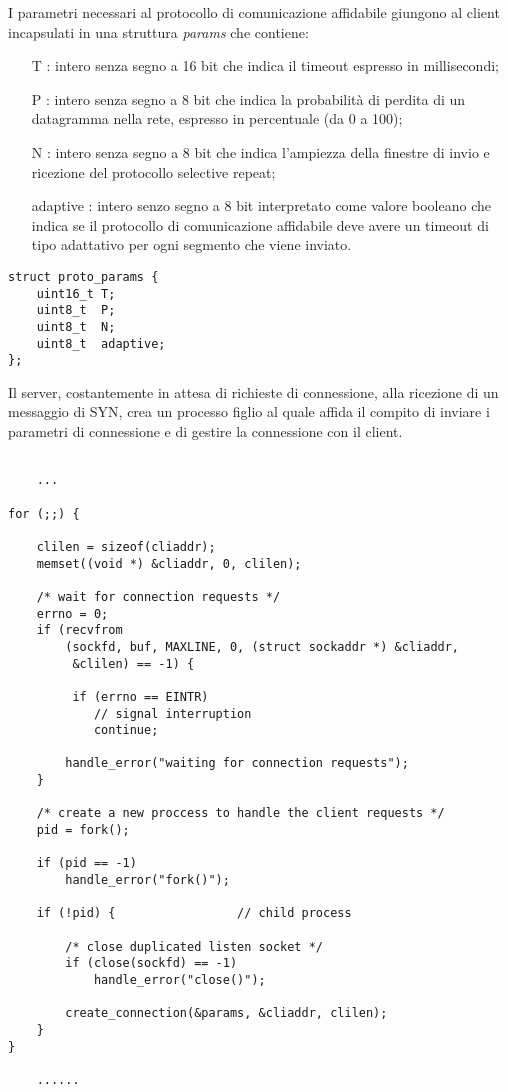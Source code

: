 I parametri necessari al protocollo di comunicazione affidabile  giungono
al client incapsulati in una struttura \emph{params} che contiene:
\begin{itemize}
\item[T]: intero senza segno a 16 bit che indica il timeout espresso in 
millisecondi;
\item[P]: intero senza segno a 8 bit che indica la probabilità di perdita di un
datagramma nella rete, espresso in percentuale (da 0 a 100);
\item[N]: intero senza segno a 8 bit che indica l'ampiezza della finestre di
invio e ricezione del protocollo selective repeat;
\item[adaptive]: intero senzo segno a 8 bit interpretato come valore booleano
che indica se il protocollo di comunicazione affidabile deve avere un timeout
di tipo adattativo per ogni segmento che viene inviato.
\end{itemize}

\begin{lstlisting}[title=basics.h]
struct proto_params {
	uint16_t T;
	uint8_t  P;
	uint8_t  N;
	uint8_t  adaptive;
};
\end{lstlisting}

Il server, costantemente in attesa di richieste di connessione, alla ricezione
di un messaggio di SYN, crea un processo figlio al quale affida il compito di 
inviare i parametri di connessione e di gestire la connessione con il client.

\begin{lstlisting}[title=server: instaurazione della connessione]

	...

for (;;) {

	clilen = sizeof(cliaddr);
	memset((void *) &cliaddr, 0, clilen);

	/* wait for connection requests */
	errno = 0;
	if (recvfrom
		(sockfd, buf, MAXLINE, 0, (struct sockaddr *) &cliaddr,
		 &clilen) == -1) {

		 if (errno == EINTR)
			// signal interruption
			continue;

		handle_error("waiting for connection requests");
	}

	/* create a new proccess to handle the client requests */
	pid = fork();

	if (pid == -1)
		handle_error("fork()");

	if (!pid) {                 // child process

		/* close duplicated listen socket */
		if (close(sockfd) == -1)
			handle_error("close()");

		create_connection(&params, &cliaddr, clilen);
	}
}

	......

\end{lstlisting}


